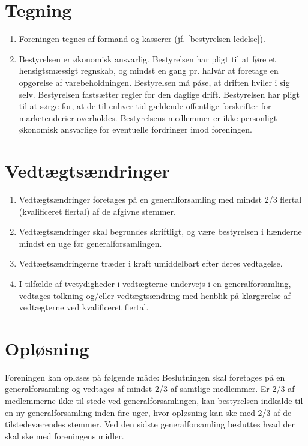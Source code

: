 \documentclass[a4paper, 10pt]{article}
\renewcommand\thesection{\textsection\arabic{section}}
\newenvironment{stykenum}{
  \begin{enumerate}[%
    label=Stk.~\arabic*., ref=\thesection~Stk.~\arabic*, start=1]
}{\end{enumerate}}
\begin{document}
\section{Tegning}
\begin{stykenum}
\item Foreningen tegnes af formand og kasserer (jf. \ref*{bestyrelsen-ledelse}).

\item Bestyrelsen er økonomisk ansvarlig.
Bestyrelsen har pligt til at føre et hensigtsmæssigt regnskab, og
mindst en gang pr. halvår at foretage en opgørelse af
varebeholdningen. Bestyrelsen må påse, at driften hviler i sig selv.
Bestyrelsen fastsætter regler for den daglige drift. Bestyrelsen har
pligt til at sørge for, at de til enhver tid gældende offentlige
forskrifter for marketenderier overholdes. Bestyrelsens medlemmer er
ikke personligt økonomisk ansvar\-lige for eventuelle fordringer imod
foreningen.
\end{stykenum}

\section{Vedtægtsændringer}
\label{vedtaegtsaendringer}

\begin{stykenum}
\item Vedtægtsændringer foretages på en generalforsamling med mindst 2/3
flertal (kvalificeret flertal) af de afgivne stemmer.

\item Vedtægtsændringer skal begrundes skriftligt, og være
bestyrelsen i hænderne mindst en uge før generalforsamlingen.

\item Vedtægtsændringerne træder i kraft umiddelbart efter deres
vedtagelse.

\item I tilfælde af tvetydigheder i vedtægterne undervejs i en
generalforsamling, vedtages tolkning og/eller vedtægtsændring med
henblik på klar\-gørelse af vedtægterne ved kvalificeret flertal.

\end{stykenum}

\section{Opløsning}

Foreningen kan opløses på følgende måde: Beslutningen skal foretages
på en generalforsamling og vedtages af mindst 2/3 af samtlige
medlemmer. Er 2/3 af medlemmerne ikke til stede ved
generalforsamlingen, kan bestyrelsen indkalde til en ny
generalforsamling inden fire uger, hvor opløsning kan ske med 2/3 af
de tilstedeværendes stemmer. Ved den sidste generalforsamling
besluttes hvad der skal ske med foreningens midler.
\end{document}
